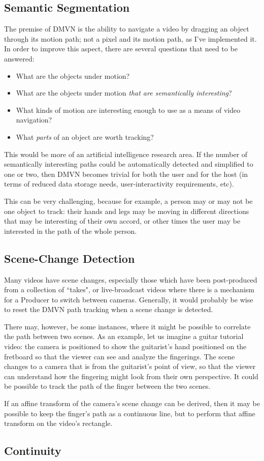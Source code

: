 \subsection{Semantic Segmentation}
The premise of DMVN is the ability to navigate a video by dragging an object through its motion path; not a pixel and its motion path, as I've implemented it. In order to improve this aspect, there are several questions that need to be answered:
\begin{itemize}
    \item What are the objects under motion?
    \item What are the objects under motion \emph{that are semantically interesting}?
    \item What kinds of motion are interesting enough to use as a means of video navigation?
    \item What \emph{parts} of an object are worth tracking?
\end{itemize}
This would be more of an artificial intelligence research area. If the number of semantically interesting paths could be automatically detected and simplified to one or two, then DMVN becomes trivial for both the user and for the host (in terms of reduced data storage needs, user-interactivity requirements, etc).
\par This can be very challenging, because for example, a person may or may not be one object to track: their hands and legs may be moving in different directions that may be interesting of their own accord, or other times the user may be interested in the path of the whole person.

\subsection{Scene-Change Detection}
    Many videos have scene changes, especially those which have been post-produced from a collection of ``takes", or live-broadcast videos where there is a mechanism for a Producer to switch between cameras. Generally, it would probably be wise to reset the DMVN path tracking when a scene change is detected.\par
    There may, however, be some instances, where it might be possible to correlate the path between two scenes. As an example, let us imagine a guitar tutorial video: the camera is positioned to show the guitarist's hand positioned on the fretboard so that the viewer can see and analyze the fingerings. The scene changes to a camera that is from the guitarist's point of view, so that the viewer can understand how the fingering might look from their own perspective. It could be possible to track the path of the finger between the two scenes.\par
    If an affine transform of the camera's scene change can be derived, then it may be possible to keep the finger's path as a continuous line, but to perform that affine transform on the video's rectangle.

\subsection{Continuity}
